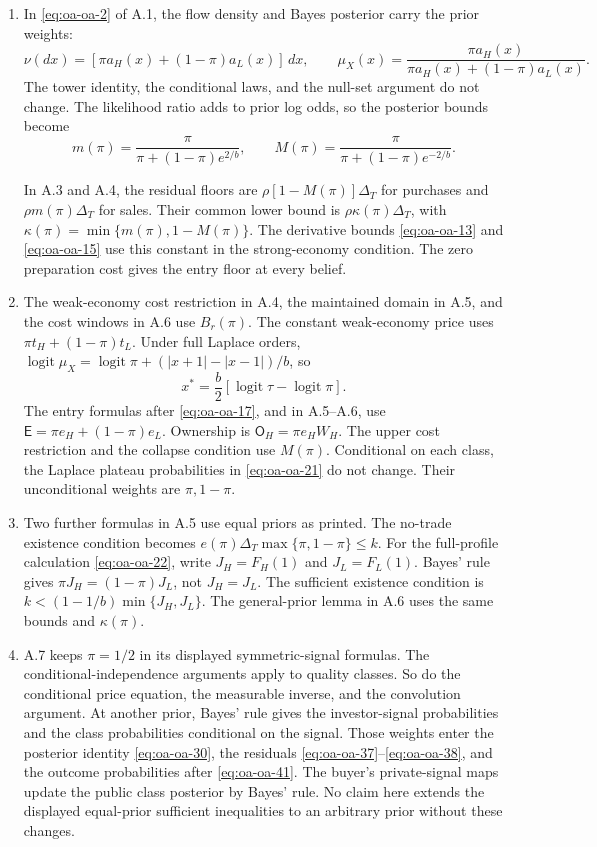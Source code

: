 \begin{enumerate}
\item
In \eqref{eq:oa-oa-2} of A.1, the flow density and Bayes posterior carry the prior weights:
\[
\nu(dx)=[\pi a_H(x)+(1-\pi)a_L(x)]\,dx,\qquad
\mu_X(x)=\frac{\pi a_H(x)}{\pi a_H(x)+(1-\pi)a_L(x)}.
\]
The tower identity, the conditional laws, and the null-set argument do not change.
The likelihood ratio adds to prior log odds, so the posterior bounds become
\[
m(\pi)=\frac{\pi}{\pi+(1-\pi)e^{2/b}},\qquad
M(\pi)=\frac{\pi}{\pi+(1-\pi)e^{-2/b}}.
\]
\par
In A.3 and A.4, the residual floors are
\(\rho[1-M(\pi)]\Delta_T\) for purchases and
\(\rho m(\pi)\Delta_T\) for sales.
Their common lower bound is \(\rho\kappa(\pi)\Delta_T\), with
\(\kappa(\pi)=\min\{m(\pi),1-M(\pi)\}\).
The derivative bounds \eqref{eq:oa-oa-13} and \eqref{eq:oa-oa-15} use this constant in the strong-economy condition.
The zero preparation cost gives the entry floor at every belief.

\item
The weak-economy cost restriction in A.4, the maintained domain in A.5,
and the cost windows in A.6 use \(B_r(\pi)\).
The constant weak-economy price uses \(\pi t_H+(1-\pi)t_L\).
Under full Laplace orders,
\(\operatorname{logit}\mu_X=\operatorname{logit}\pi+(|x+1|-|x-1|)/b\), so
\[
x^*=\frac b2[\operatorname{logit}\tau-\operatorname{logit}\pi].
\]
The entry formulas after \eqref{eq:oa-oa-17}, and in A.5--A.6, use
\(\mathsf E=\pi e_H+(1-\pi)e_L\).
Ownership is \(\mathsf O_H=\pi e_HW_H\).
The upper cost restriction and the collapse condition use \(M(\pi)\).
Conditional on each class, the Laplace plateau probabilities in \eqref{eq:oa-oa-21} do not change.
Their unconditional weights are \(\pi,1-\pi\).

\item
Two further formulas in A.5 use equal priors as printed.
The no-trade existence condition becomes
\(e(\pi)\Delta_T\max\{\pi,1-\pi\}\le k\).
For the full-profile calculation \eqref{eq:oa-oa-22}, write \(J_H=F_H(1)\) and \(J_L=F_L(1)\).
Bayes' rule gives \(\pi J_H=(1-\pi)J_L\), not \(J_H=J_L\).
The sufficient existence condition is
\(k<(1-1/b)\min\{J_H,J_L\}\).
The general-prior lemma in A.6 uses the same bounds and \(\kappa(\pi)\).

\item
A.7 keeps \(\pi=1/2\) in its displayed symmetric-signal formulas.
The conditional-independence arguments apply to quality classes.
So do the conditional price equation, the measurable inverse, and the convolution argument.
At another prior, Bayes' rule gives the investor-signal probabilities and the class probabilities conditional on the signal.
Those weights enter the posterior identity \eqref{eq:oa-oa-30}, the residuals \eqref{eq:oa-oa-37}--\eqref{eq:oa-oa-38}, and the outcome probabilities after \eqref{eq:oa-oa-41}.
The buyer's private-signal maps update the public class posterior by Bayes' rule.
No claim here extends the displayed equal-prior sufficient inequalities to an arbitrary prior without these changes.


\end{enumerate}
